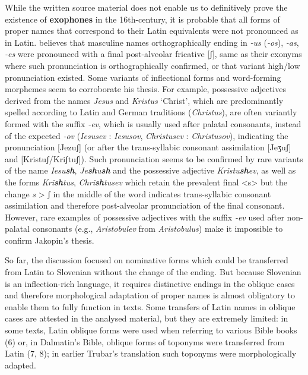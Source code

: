 \documentclass[output=paper,colorlinks,citecolor=brown,arabicfont,chinesefont]{langscibook}
\begin{document}
While the written source material does not enable us to definitively prove the existence of \textbf{exophones} in the 16th-century, it is probable that all forms of proper names that correspond to their Latin equivalents were not pronounced as in Latin. \citet[72--73]{Jakopin1986} believes that masculine names orthographically ending in \emph{-us} (\emph{-os}), \emph{-as}, \emph{-es} were pronounced with a final post-alveolar fricative [ʃ], same as their exonyms where such pronunciation is orthographically confirmed, or that variant high/low pronunciation existed. Some variants of inflectional forms and word-forming morphemes seem to corroborate his thesis. For example, possessive adjectives derived from the names \emph{Jesus} and \emph{Kristus} ‘Christ’, which are predominantly spelled according to Latin and German traditions (\emph{Christus}), are often variantly formed with the suffix \emph{-ev}, which is usually used after palatal consonants, instead of the expected \emph{-ov} (\emph{Iesusev} : \emph{Iesusov}, \emph{Christusev} : \emph{Christusov}), indicating the pronunciation [Jezuʃ] (or after the trans-syllabic consonant assimilation [Jeʒuʃ] and [Kristuʃ/Kriʃtuʃ]). Such pronunciation seems to be confirmed by rare variants of the name \emph{Iesu\textbf{sh}}, \emph{Je\textbf{sh}u\textbf{sh}} and the possessive adjective \emph{Kristu\textbf{sh}ev}, as well as the forms \emph{Kri\textbf{sh}tus}, \emph{Chri\textbf{sh}tusev} which retain the prevalent final <s> but the change \emph{s} > ʃ in the middle of the word indicates trans-syllabic consonant assimilation and therefore post-alveolar pronunciation of the final consonant. However, rare examples of possessive adjectives with the suffix \emph{-ev} used after non-palatal consonants (e.g., \emph{Aristobulev} from \emph{Aristobulus}) make it impossible to confirm Jakopin’s thesis. 

So far, the discussion focused on nominative forms which could be transferred from Latin to Slovenian without the change of the ending. But because Slovenian is an inflection-rich language, it requires distinctive endings in the oblique cases and therefore morphological adaptation of proper names is almost obligatory to enable them to fully function in texts.  Some transfers of Latin names in oblique cases are attested in the analysed material, but they are extremely limited: in some texts, Latin oblique forms were used when referring to various Bible books (6) or, in Dalmatin’s Bible, oblique forms of toponyms were transferred from Latin (7, 8); in earlier Trubar’s translation such toponyms were morphologically adapted.
\end{document}
